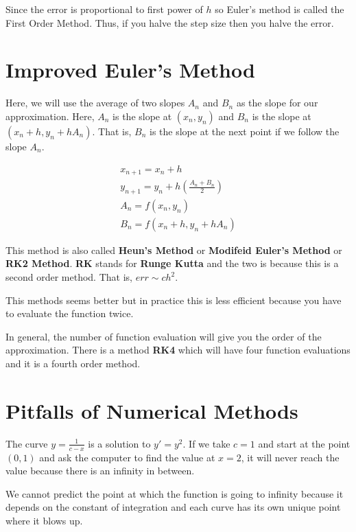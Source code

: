 Since the error is proportional to first power of $h$ so Euler's method is called the First Order Method.
Thus, if you halve the step size then you halve the error.

\pagebreak

\section{Improved Euler's Method}

Here, we will use the average of two slopes $A_n$ and $B_n$ as the slope for our approximation.
Here, $A_n$ is the slope at $(x_n, y_n)$ and $B_n$ is the slope at $(x_n + h, y_n + h A_n)$.
That is, $B_n$ is the slope at the next point if we follow the slope $A_n$.

\begin{gather*}
	x_{n+1} = x_n + h \\
	y_{n+1} = y_n + h \left( \frac{A_n + B_n}{2} \right) \\
	A_n = f(x_n, y_n) \\
	B_n = f(x_n + h, y_n + h A_n)
\end{gather*}


This method is also called {\bf Heun's Method} or {\bf Modifeid Euler's Method} or {\bf RK2 Method}.
{\bf RK} stands for {\bf Runge Kutta} and the two is because this is a second order method.
That is, $err \sim c h^2$.

This methods seems better but in practice this is less efficient because you have to evaluate the function twice.

In general, the number of function evaluation will give you the order of the approximation.
There is a method {\bf RK4} which will have four function evaluations and it is a fourth order method.

\section{Pitfalls of Numerical Methods}

The curve $y = \frac{1}{c-x}$ is a solution to $y' = y^2$.
If we take $c = 1$ and start at the point $(0, 1)$ and ask the computer to find the value at $x = 2$,
it will never reach the value because there is an infinity in between.

We cannot predict the point at which the function is going to infinity because it depends on the constant of integration and each curve has its own unique point where it blows up.

